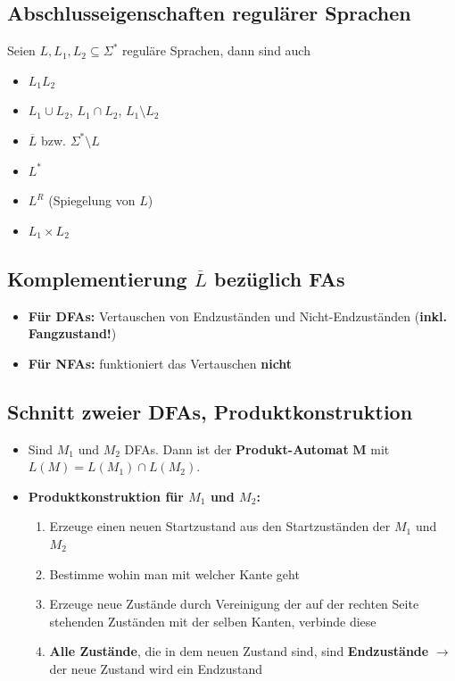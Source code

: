 \documentclass[ieeetran]{article}
\begin{document}
\subsection{Abschlusseigenschaften regulärer Sprachen} %
\label{sub:abschlusseigenschaften_regulärer_sprachen}
Seien $L, L_1, L_2 \subseteq \Sigma^*$ reguläre Sprachen, dann sind auch
\begin{itemize}
  \item $L_1 L_2$
\item $L_1 \cup L_2$, $L_1 \cap L_2$, $L_1 \setminus L_2$
\item $\overline{L}$ bzw. $\Sigma^* \setminus L$

\item $L^*$
\item $L^R$ (Spiegelung von $L$)
\item $L_1 \times L_2$
\end{itemize}

\subsection{Komplementierung $\overline{L}$ bezüglich FAs} %
\label{sub:komplementierung_bezüglich_fAs}
\begin{itemize}
  \item \textbf{Für DFAs:} Vertauschen von Endzuständen und Nicht-Endzuständen (\textbf{inkl. Fangzustand!})
\item \textbf{Für NFAs:} funktioniert das Vertauschen \textbf{nicht} 
\end{itemize}

\subsection{Schnitt zweier DFAs, Produktkonstruktion} %
\label{sub:produktkonstruktion}
\begin{itemize}
	\item Sind $M_1$ und $M_2$ DFAs. Dann ist der \textbf{Produkt-Automat} $\mathbf{M}$ mit $L(M) = L(M_1) \cap L(M_2)$.

	\item \textbf{Produktkonstruktion für $M_1$ und $M_2$:}
		\begin{enumerate}
			\item Erzeuge einen neuen Startzustand aus den Startzuständen der $M_1$ und $M_2$
			\item Bestimme wohin man mit welcher Kante geht
			\item Erzeuge neue Zustände durch Vereinigung der auf der rechten Seite stehenden Zuständen mit der selben Kanten, verbinde diese
			\item \textbf{Alle Zustände}, die in dem neuen Zustand sind, sind \textbf{Endzustände} $\rightarrow$ der neue Zustand wird ein Endzustand
		\end{enumerate}
\end{itemize}
\end{document}
